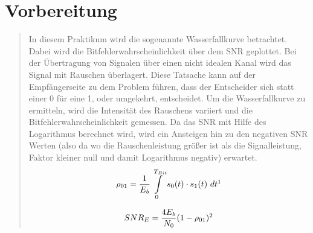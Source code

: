 \section{Vorbereitung}
\begin{quote}
       In diesem Praktikum wird die sogenannte Wasserfallkurve betrachtet. Dabei wird die Bitfehlerwahrscheinlichkeit
       über dem SNR geplottet. Bei der Übertragung von Signalen über einen nicht idealen Kanal wird das Signal mit
       Rauschen überlagert. Diese Tatsache kann auf der Empfängerseite zu dem Problem führen, dass der Entscheider sich
       statt einer 0 für eine 1, oder umgekehrt, entscheidet. Um die Wasserfallkurve zu ermitteln, wird die
       Intensität des Rauschens variiert und die Bitfehlerwahrscheinlichkeit gemessen.
       Da das SNR mit Hilfe des Logarithmus berechnet wird, wird ein Ansteigen hin zu den negativen SNR Werten (also da wo die Rauschenleistung größer ist als die Signalleistung, Faktor kleiner null und damit Logarithmus
       negativ) erwartet. \\
    
  
  
    \begin{equation}
	     \begin{split}
		\rho_{01}=\frac{1}{E_{b}} \int\limits_{0}^{T_{Bit}}  s_{0}(t) \cdot s_{1}(t)  \ dt
           \footnotemark
	     \end{split}
    \end{equation} 
     \label{eq:rho01}
    
    \begin{equation}
	     \begin{split}
		SNR_{E}=\frac{4E_{b}}{N_{0}}(1-\rho_{01})
           \footnotemark
	     \end{split}
    \end{equation}  
     \label{eq:SNR}
           

\end{quote}
